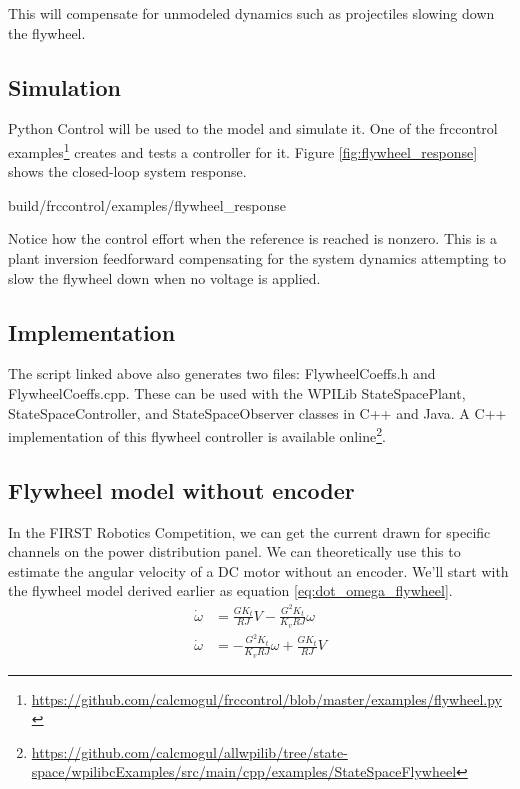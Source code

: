 This will compensate for unmodeled dynamics such as projectiles slowing down the
flywheel.

\subsection{Simulation}

Python Control will be used to  the
\gls{model} and simulate it. One of the frccontrol
examples\footnote{\url{https://github.com/calcmogul/frccontrol/blob/master/examples/flywheel.py}}
creates and tests a controller for it. Figure \ref{fig:flywheel_response} shows
the closed-loop \gls{system} response.
\begin{svg}{build/frccontrol/examples/flywheel_response}
  \caption{Flywheel response}
  \label{fig:flywheel_response}
\end{svg}

Notice how the \gls{control effort} when the \gls{reference} is reached is
nonzero. This is a plant inversion feedforward compensating for the \gls{system}
dynamics attempting to slow the flywheel down when no voltage is applied.

\subsection{Implementation}

The script linked above also generates two files: FlywheelCoeffs.h and
FlywheelCoeffs.cpp. These can be used with the WPILib StateSpacePlant,
StateSpaceController, and StateSpaceObserver classes in C++ and Java. A C++
implementation of this flywheel controller is available online\footnote{
\url{https://github.com/calcmogul/allwpilib/tree/state-space/wpilibcExamples/src/main/cpp/examples/StateSpaceFlywheel}}.

\subsection{Flywheel model without encoder}

In the FIRST Robotics Competition, we can get the current drawn for specific
channels on the power distribution panel. We can theoretically use this to
estimate the angular velocity of a DC motor without an encoder. We'll start with
the flywheel model derived earlier as equation \eqref{eq:dot_omega_flywheel}.
\begin{align*}
  \dot{\omega} &= \frac{G K_t}{RJ} V - \frac{G^2 K_t}{K_v RJ} \omega \\
  \dot{\omega} &= -\frac{G^2 K_t}{K_v RJ} \omega + \frac{G K_t}{RJ} V
\end{align*}

